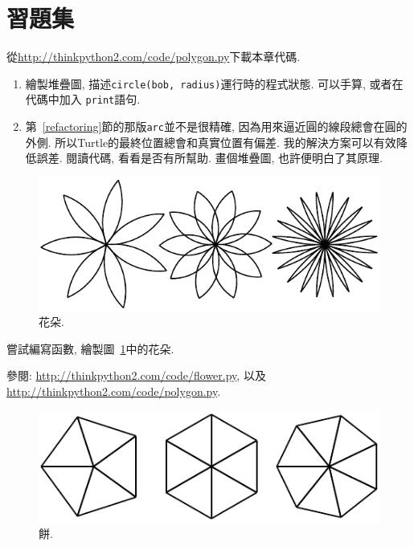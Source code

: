 \documentclass[10pt]{book}
\begin{document}
\section{習題集}

\begin{exercise}

從\url{http://thinkpython2.com/code/polygon.py}下載本章代碼. 

\begin{enumerate}

\item 繪製堆疊圖, 描述{\tt circle(bob, radius)}運行時的程式狀態. 
可以手算, 或者在代碼中加入 {\tt print}語句.

\item 第~\ref{refactoring}節的那版{\tt arc}並不是很精確, 
因為用來逼近圓的線段總會在圓的外側. 
所以Turtle的最終位置總會和真實位置有偏差. 
我的解決方案可以有效降低誤差. 閱讀代碼, 看看是否有所幫助. 
畫個堆疊圖, 也許便明白了其原理. 

\end{enumerate}

\end{exercise}

\begin{figure}
\centerline
{\includegraphics[scale=0.8]{figs/flowers.pdf}}
\caption{花朵.}
\label{fig.flowers}
\end{figure}

\begin{exercise}

嘗試編寫函數, 繪製圖~\ref{fig.flowers}中的花朵. 

參閱: \url{http://thinkpython2.com/code/flower.py},
以及 \url{http://thinkpython2.com/code/polygon.py}.

\end{exercise}

\begin{figure}
\centerline
{\includegraphics[scale=0.8]{figs/pies.pdf}}
\caption{餅.}
\label{fig.pies}
\end{figure}
\end{document}
